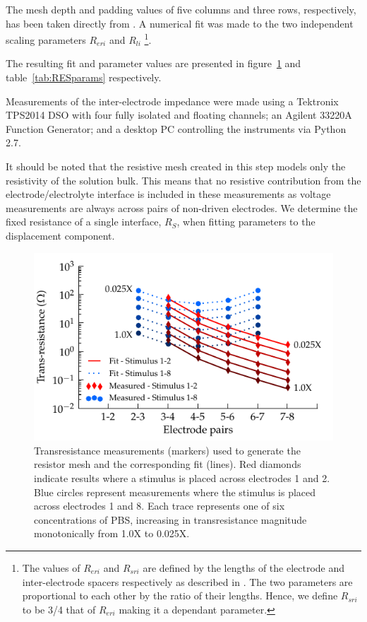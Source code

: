 \documentclass[journal, a4paper]{IEEEtran}
\begin{document}
The mesh depth and padding values of five columns and three rows, respectively, has been taken directly from \cite{ScottSingle2013}.
A numerical fit was made to the two independent scaling parameters $R_{eri}$ and $R_{li}$
\footnote{The values of $R_{eri}$ and $R_{sri}$ are defined by the lengths of the electrode and inter-electrode spacers respectively as described in \cite{ScottSingle2013}. The two parameters are proportional to each other by the ratio of their lengths. Hence, we define $R_{sri}$ to be 3/4 that of $R_{eri}$ making it a dependant parameter.}.

The resulting fit and parameter values are presented in figure~\ref{fig:transresistance} and table~\ref{tab:RESparams} respectively.

Measurements of the inter-electrode impedance were made using a Tektronix TPS2014 DSO with four fully isolated and floating channels; an Agilent 33220A Function Generator; and a desktop PC controlling the instruments via Python 2.7.


It should be noted that the resistive mesh created in this step models only the resistivity of the solution bulk. This means that no resistive contribution from the electrode/electrolyte interface is included in these measurements as voltage measurements are always across pairs of non-driven electrodes. We determine the fixed resistance of a single interface, $R_{S}$, when fitting parameters to the displacement component.


\begin{figure}
    \begin{center}
        \includegraphics{graphics/pbs_transimpedance_IEEE}
    \end{center}
    \caption{Transresistance measurements (markers) used to generate the resistor mesh and the corresponding fit (lines). Red diamonds indicate results where a stimulus is placed across electrodes 1 and 2. Blue circles represent measurements where the stimulus is placed across electrodes 1 and 8. Each trace represents one of six concentrations of PBS, increasing in transresistance magnitude monotonically from 1.0X to 0.025X.}
    \label{fig:transresistance}
\end{figure}
\end{document}
